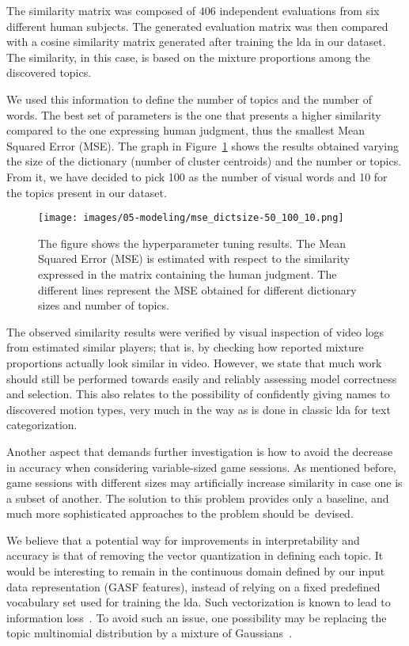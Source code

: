{The similarity matrix was composed of $406$ independent evaluations from six different human subjects. The generated evaluation matrix was then compared with a cosine similarity matrix generated after training the \gls{lda} in our dataset. The similarity, in this case, is based on the mixture proportions among the discovered topics. 

We used this information to define the number of topics and the number of words. The best set of parameters is the one that presents a higher similarity compared to the one expressing human judgment, thus the smallest Mean Squared Error (MSE). The graph in Figure~\ref{hyperparameter_results} shows the results obtained varying the size of the dictionary (number of cluster centroids) and the number or topics. From it, we have decided to pick 100 as the number of visual words and 10 for the topics present in our dataset.

\begin{figure}[H]
	\centering
	\texttt{[image: images/05-modeling/mse\_dictsize-50\_100\_10.png]}
	\caption{The figure shows the hyperparameter tuning results. The Mean Squared Error (MSE) is estimated with respect to the similarity expressed in the matrix containing the human judgment. The different lines represent the MSE obtained for different dictionary sizes and number of topics.}
  \label{hyperparameter_results}
\end{figure}

The observed similarity results were verified by visual inspection of video logs from estimated similar players; that is, by checking how reported mixture proportions actually look similar in video. However, we state that much work should still be performed towards easily and reliably assessing model correctness and selection. This also relates to the possibility of confidently giving names to discovered motion types, very much in the way as is done in classic \gls{lda} for text categorization.

Another aspect that demands further investigation is how to avoid the decrease in accuracy when considering variable-sized game sessions. As mentioned before, game sessions with different sizes may artificially increase similarity in case one is a subset of another. The solution to this problem provides only a baseline, and much more sophisticated approaches to the problem should be~devised.

We believe that a potential way for improvements in interpretability and accuracy is that of removing the vector quantization in defining each topic. It would be interesting to remain in the continuous domain defined by our input data representation (GASF features), instead of relying on a fixed predefined vocabulary set used for training the \gls{lda}. Such vectorization is known to lead to information loss~\cite{hu_latent_2012}. To avoid such an issue, one possibility may be replacing the topic multinomial distribution by a mixture of Gaussians~\cite{hu_latent_2012}.

}

